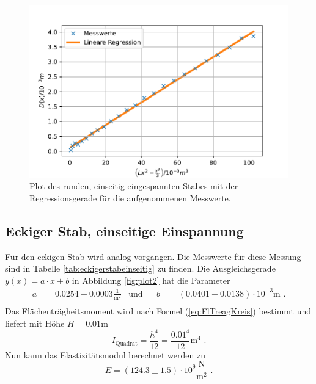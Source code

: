 \begin{figure}[H]
  \centering
  \includegraphics{pictures/Lineare Regression1.pdf}
  \caption{Plot des runden, einseitig eingespannten Stabes mit der Regressionsgerade für die aufgenommenen Messwerte.}
  \label{fig:plot1}
\end{figure}

\subsection{Eckiger Stab, einseitige Einspannung}

Für den eckigen Stab wird analog vorgangen.
Die Messwerte für diese Messung sind in Tabelle \ref{tab:eckigerstabeinseitig} zu finden.
Die Ausgleichsgerade $y(x) = a \cdot x + b$ in Abbildung \ref{fig:plot2} hat die Parameter
\begin{align*}
  a &= 0.0254 ± 0.0003 \frac{1}{\unit{\meter\squared}} & \text{und}& & b&= (0.0401 ± 0.0138) \cdot 10^{-3} \unit\meter \text{ .} \\
\end{align*}
Das Flächenträgheitsmoment wird nach Formel (\ref{eq:FlTreagKreis}) bestimmt und liefert mit Höhe $H = 0.01 \unit\meter$
\begin{equation*}
  I_\text{Quadrat} = \frac{h^4} {12} = \frac{0.01^4} {12} \unit{\meter}^4 \text{ .}
\end{equation*}
Nun kann das Elastizitätsmodul berechnet werden zu
\begin{equation*}
  E = (124.3 \pm 1.5) \cdot 10^{9} \frac{\unit\newton}{\unit\meter^2} \text{ .}
\end{equation*}


